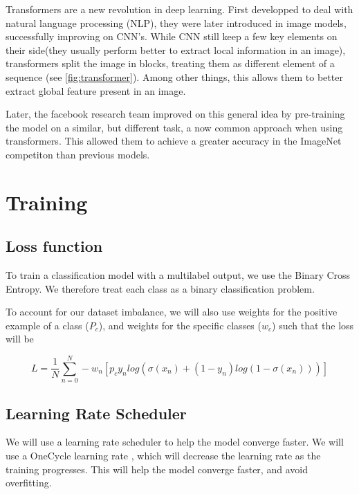 \documentclass[11pt]{article}
\begin{document}
        Transformers are a new revolution in deep learning. First developped to deal with natural language processing (NLP),
        they were later introduced in image models, successfully improving on CNN's. While CNN still keep a few key
        elements on their side(they usually perform better to extract local information in an image), transformers split the image in blocks,
        treating them as different element of a sequence (see \ref{fig:transformer}). Among other things, this allows them to better extract global feature present in an image.

        Later, the facebook research team improved on this general idea by pre-training the model on a similar, but different task, a now
        common approach when using transformers. This allowed them to achieve a greater accuracy in the ImageNet competiton than previous models.
    

    \section{Training}


    \subsection{Loss function}
        To train a classification model with a multilabel output, we use the Binary Cross Entropy. We therefore treat
        each class as a binary classification problem.

        To account for our dataset imbalance, we will also use weights for the positive example of a class ($P_c$), and weights for the specific classes ($w_c$) such that the loss will be

        \begin{equation}
            L = \frac{1}{N}\sum_{n=0}^N -w_n[p_c y_n log(\sigma(x_n)+(1-y_n) log(1-\sigma(x_n)))]
        \end{equation}

    \subsection{Learning Rate Scheduler}

        We will use a learning rate scheduler to help the model converge faster. We will use a OneCycle learning rate \cite{onecyclelr}, which will
        decrease the learning rate as the training progresses. This will help the model converge faster, and avoid overfitting.
\end{document}
